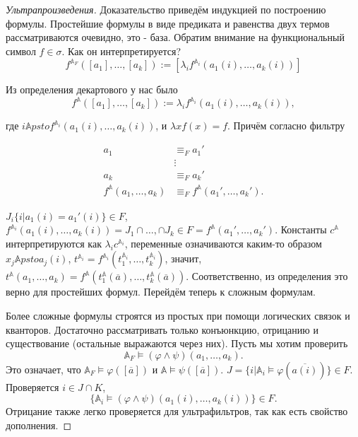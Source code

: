 \begin{proof}[Ультрапроизведения]
    Доказательство приведём индукцией по построению формулы. Простейшие формулы в виде предиката и равенства двух термов рассматриваются очевидно, это - база. Обратим внимание на функциональный символ $f \in \sigma$. Как он интерпретируется? $$f^{\mathbb{A}_F}([a_1], \ldots, [a_k]):= [\lambda_i f^{\mathbb{A}_i}(a_1(i), \ldots, a_k(i))]$$ 

    Из определения декартового у нас было $$f^{\mathbb{A}}([a_1], \ldots, [a_k]):= \lambda_i f^{\mathbb{A}_i}(a_1(i), \ldots, a_k(i)),$$ 

    где $i \mathbb{A}psto f^{\mathbb{A}_i}(a_1(i), \ldots, a_k(i))$, и $\lambda x f(x) = f$. Причём согласно фильтру 

    \begin{equation*}
        \begin{aligned}
            a_1 &\equiv_F a_1' \\ 
            &\vdots \\ 
            a_k &\equiv_F a_k' \\ 
            f^{\mathbb{A}}(a_1, \ldots, a_k) &\equiv_F f^{\mathbb{A}}(a_1', \ldots, a_k').
        \end{aligned}
    \end{equation*} 

    $J_i \{i| a_1(i) = a_1'(i)\} \in F$, $f^{\mathbb{A}_i}(a_1(i), \ldots, a_k(i)) = J_1 \cap \ldots, \cap J_k \in F = f^{\mathbb{A}}(a_1', \ldots, a_k')$. Константы $c^{\mathbb{A}}$ интерпретируются как $\lambda_i c^{\mathbb{A}_i}$, переменные означиваются каким-то образом $x_j \mathbb{A}psto a_j(i)$, $t^{\mathbb{A}_i} = f^{\mathbb{A}_i}(t_1^{\mathbb{A}_i}, \ldots, t_k^{\mathbb{A}_i})$, значит, $t^{\mathbb{A}}(a_1, \ldots, a_k) = f^{\mathbb{A}}(t_1^{\mathbb{A}}(\overline{a}), \ldots, t_k^{\mathbb{A}}(\overline{a}))$. Соответственно, из определения это верно для простейших формул. Перейдём теперь к сложным формулам. \ 
    
    Более сложные формулы строятся из простых при помощи логических связок и кванторов. Достаточно рассматривать только конъюнкцию, отрицанию и существование (остальные выражаются через них). Пусть мы хотим проверить $$\mathbb{A}_F \models (\varphi \wedge \psi)(a_1, \ldots, a_k).$$ Это означает, что $\mathbb{A}_F \models \varphi([\overline{a}])$ и $\mathbb{A} \models \psi ([\overline{a}])$. $J = \{i | \mathbb{A}_i \models \varphi(\overline{a(i)})\} \in F$. Проверяется $i \in J \cap K$, $$\{\mathbb{A}_i \models (\varphi \wedge \psi)(a_1(i), \ldots, a_k(i))\} \in F.$$ Отрицание также легко проверяется для ультрафильтров, так как есть свойство дополнения. 


\end{proof}
